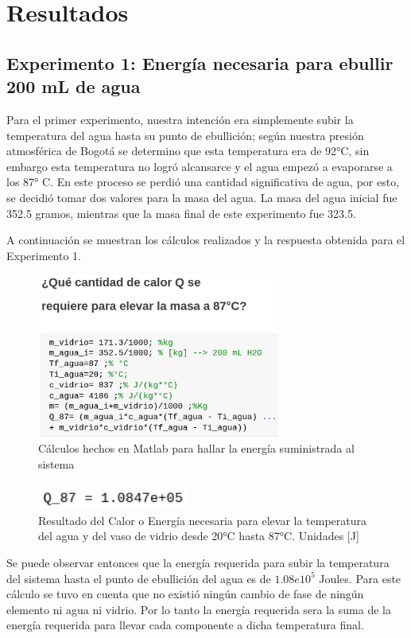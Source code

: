 \documentclass[journal,transmag]{IEEEtran}
\begin{document}
\section{Resultados} 

\subsection{Experimento 1: Energía necesaria para ebullir 200 mL de agua}

Para el primer experimento, nuestra intención era simplemente subir la temperatura del agua hasta su punto de ebullición; según nuestra presión atmosférica de Bogotá se determino que esta temperatura era de 92°C, sin embargo esta temperatura no logró alcansarce y el agua empezó a evaporarse a los 87° C. En este proceso se perdió una cantidad significativa de agua, por esto, se decidió tomar dos valores para la masa del agua. La masa del agua inicial fue 352.5 gramos, mientras que la masa final de este experimento fue 323.5.

A continuación se muestran los cálculos realizados y la respuesta obtenida para el Experimento 1.

\begin{figure}[!h] 
	\center 
	\includegraphics[width=8cm]{img/ans1.png} 
	\caption{Cálculos hechos en Matlab para hallar la energía suministrada al sistema} 
	\label{T4} 
\end{figure} 
\begin{figure}[!h] 
	\center 
	\includegraphics[width=5cm]{img/ans11.png} 
	\caption{Resultado del Calor o Energía necesaria para elevar la temperatura del agua y del vaso de vidrio desde 20°C hasta 87°C. Unidades [J]} 
	\label{T4} 
\end{figure} 

Se puede observar entonces que la energía requerida para subir la temperatura del sistema hasta el punto de ebullición del agua es de  $ 1.08e10^5$ Joules.
Para este cálculo se tuvo en cuenta que no existió ningún cambio de fase de ningún elemento ni agua ni vidrio. Por lo tanto la energía requerida sera la suma de la energía requerida para llevar cada componente a dicha temperatura final.
\end{document}
